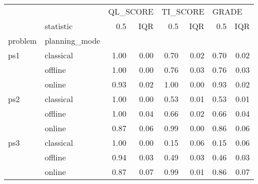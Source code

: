 \begin{tabular}{llrrrrrr}
\toprule
    & {} & \multicolumn{2}{l}{QL\_SCORE} & \multicolumn{2}{l}{TI\_SCORE} & \multicolumn{2}{l}{GRADE} \\
    & statistic &      0.5 &  IQR &      0.5 &  IQR &   0.5 &  IQR \\
problem & planning\_mode &          &      &          &      &       &      \\
\midrule
ps1 & classical &     1.00 & 0.00 &     0.70 & 0.02 &  0.70 & 0.02 \\
    & offline &     1.00 & 0.00 &     0.76 & 0.03 &  0.76 & 0.03 \\
    & online &     0.93 & 0.02 &     1.00 & 0.00 &  0.93 & 0.02 \\
ps2 & classical &     1.00 & 0.00 &     0.53 & 0.01 &  0.53 & 0.01 \\
    & offline &     1.00 & 0.04 &     0.66 & 0.02 &  0.66 & 0.04 \\
    & online &     0.87 & 0.06 &     0.99 & 0.00 &  0.86 & 0.06 \\
ps3 & classical &     1.00 & 0.00 &     0.15 & 0.06 &  0.15 & 0.06 \\
    & offline &     0.94 & 0.03 &     0.49 & 0.03 &  0.46 & 0.03 \\
    & online &     0.87 & 0.07 &     0.99 & 0.01 &  0.86 & 0.07 \\
\bottomrule
\end{tabular}
